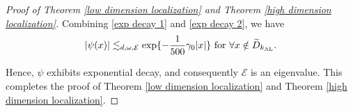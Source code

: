 \documentclass[11pt,reqno,UTF8,twoside]{amsart}
\newcommand{\mcE}{\mathcal{E}}
\theoremstyle{definition}
\numberwithin{equation}{section}
\begin{document}
\begin{proof}[Proof of Theorem \ref{low dimension localization} and Theorem \ref{high dimension localization}]
Combining \eqref{exp decay 1} and \eqref{exp decay 2}, we have 
\begin{equation}\label{exp decay 3}
|\psi(x)|\lesssim_{d,\omega,\mcE} \exp\{-\frac{1}{500}\gamma_0 |x|\}\ {\rm for}\ \forall x\notin \widetilde{D}_{k_{\text{AL}}}.
\end{equation}

Hence,  $\psi$ exhibits exponential decay, and consequently $\mcE$ is an eigenvalue. This completes the proof of Theorem \ref{low dimension localization} and Theorem \ref{high dimension localization}.





\end{proof}
\end{document}
